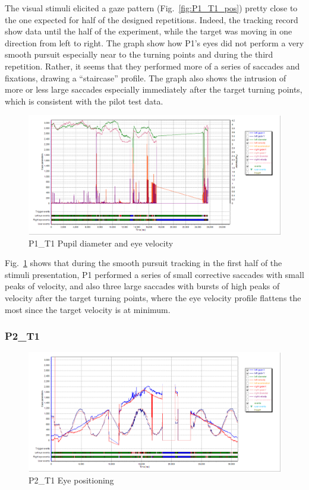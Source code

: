 The visual stimuli elicited a gaze pattern (Fig.~\ref{fig:P1_T1_pos}) pretty close to the one expected for half of the designed repetitions. Indeed, the tracking record show data until the half of the experiment, while the target was moving in one direction from left to right. The graph show how P1’s eyes did not perform a very smooth pursuit especially near to the turning points and during the third repetition. Rather, it seems that they performed more of a series of saccades and fixations, drawing a “staircase” profile.
The graph also shows the intrusion of more or less large saccades especially immediately after the target turning points, which is consistent with the pilot test data.

\begin{figure}[h]
  \centering
  \includegraphics[width=.8\textwidth]{figures/graphs/P1_T1(sinusoid)_VP.png}
  \caption[P1\_T1 Pupil size and velocity profile]{P1\_T1 Pupil diameter and eye velocity}
  \label{fig:P1_T1_vel}
\end{figure}

Fig.~\ref{fig:P1_T1_vel} shows that during the smooth pursuit tracking in the first half of the stimuli presentation, P1 performed a series of small corrective saccades with small peaks of velocity, and also three large saccades with bursts of high peaks of velocity after the target turning points, where the eye velocity profile flattens the most since the target velocity is at minimum.



\subsubsection{P2\_T1}
\label{sec:P2_T1}

\begin{figure}[h]
  \centering
  \includegraphics[width=.8\textwidth]{figures/graphs/P2_T1(sinusoid)_XY.png}
  \caption[P2\_T1 Eye positioning]{P2\_T1 Eye positioning}
  \label{fig:P2_T1_pos}
\end{figure}

